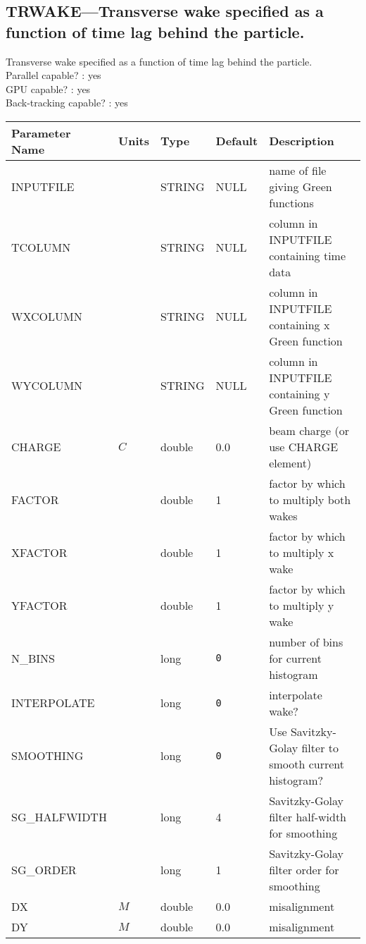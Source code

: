 \subsection{TRWAKE---Transverse wake specified as a function of time lag behind the particle.}
Transverse wake specified as a function of time lag behind the particle.
\\
Parallel capable? : yes\\
GPU capable? : yes\\
Back-tracking capable? : yes\\
\begin{tabular}{|l|l|l|l|p{\descwidth}|} \hline
Parameter Name & Units & Type & Default & Description \\ \hline 
INPUTFILE &  & STRING &   NULL            & name of file giving Green functions  \\ \hline 
TCOLUMN &  & STRING &   NULL            & column in INPUTFILE containing time data  \\ \hline 
WXCOLUMN &  & STRING &   NULL            & column in INPUTFILE containing x Green function  \\ \hline 
WYCOLUMN &  & STRING &   NULL            & column in INPUTFILE containing y Green function  \\ \hline 
CHARGE & $C$ & double &  0.0 & beam charge (or use CHARGE element)  \\ \hline 
FACTOR &  & double &   1 & factor by which to multiply both wakes  \\ \hline 
XFACTOR &  & double &   1 & factor by which to multiply x wake  \\ \hline 
YFACTOR &  & double &   1 & factor by which to multiply y wake  \\ \hline 
N\_BINS &  & long &  \verb|0| & number of bins for current histogram  \\ \hline 
INTERPOLATE &  & long &  \verb|0| & interpolate wake?  \\ \hline 
SMOOTHING &  & long &  \verb|0| & Use Savitzky-Golay filter to smooth current histogram?  \\ \hline 
SG\_HALFWIDTH &  & long &   4               & Savitzky-Golay filter half-width for smoothing  \\ \hline 
SG\_ORDER &  & long &   1               & Savitzky-Golay filter order for smoothing  \\ \hline 
DX & $M$ & double &  0.0 & misalignment  \\ \hline 
DY & $M$ & double &  0.0 & misalignment  \\ \hline 

\end{tabular}
